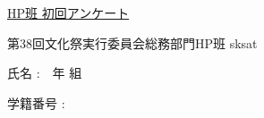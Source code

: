 \documentclass{jarticle}
\begin{document}
\begin{center}
	{\Huge \underline{HP班 初回アンケート}}
\end{center}

\begin{flushright}
	{\small 第38回文化祭実行委員会総務部門HP班 sksat}
\end{flushright}

\vspace{3mm}
氏名 : \ \underline{\hspace{2ex}}\,年\,\underline{\hspace{2ex}}\,組\,\underline{\hspace{7em}}

\vspace{3mm}
学籍番号 : \underline{\hspace{7em}}
\end{document}
